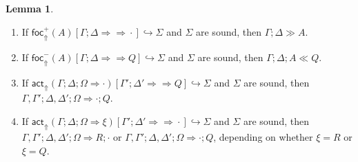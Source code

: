 \documentclass{article}
\theoremstyle{definition}
\newtheorem{lemma}{Lemma}
\newcommand{\bneuseqsymb}{
  \mathrel{\Longrightarrow\!\!\!\!\!\!\!\!\Longrightarrow}}
\newcommand{\bneuseq}[3]{#1 ; #2 \bneuseqsymb #3}
\newcommand{\brfrel}[1]{\textsf{foc}^+_{\Uparrow}(#1)}
\newcommand{\blfrel}[1]{\textsf{foc}^-_{\Uparrow}(#1)}
\newcommand{\bactrel}[1]{\textsf{act}_{\Uparrow}(#1)}
\newcommand{\relj}[3]{#1 [#2] \hookrightarrow #3}
\newcommand{\brfrelj}[3]{\relj{\brfrel{#1}}{#2}{#3}}
\newcommand{\blfrelj}[3]{\relj{\blfrel{#1}}{#2}{#3}}
\newcommand{\bactrelj}[3]{\relj{\bactrel{#1}}{#2}{#3}}
\newcommand{\btriseq}[4]{#1; #2; #3 \Longrightarrow #4}
\newcommand{\rfocseq}[3]{#1; #2 \gg #3}
\newcommand{\lfocseq}[4]{#1; #2; #3 \ll #4}
\begin{document}
\begin{lemma}\label{bkwdder-soundness-lemma}
  \begin{enumerate}
  \item If $\brfrelj{A}{\bneuseq{\Gamma}{\Delta}{\cdot}}{\Sigma}$ and $\Sigma$
    are sound, then $\rfocseq{\Gamma}{\Delta}{A}$.
  \item If $\blfrelj{A}{\bneuseq{\Gamma}{\Delta}{Q}}{\Sigma}$ and $\Sigma$
    are sound, then $\lfocseq{\Gamma}{\Delta}{A}{Q}$. 
  \item If
    $\bactrelj{\btriseq{\Gamma}{\Delta}{\Omega}{\cdot}}{\bneuseq{\Gamma'}{\Delta'}{Q}}{\Sigma}$
    and $\Sigma$ are sound, then $\btriseq{\Gamma, \Gamma'}{\Delta,
      \Delta'}{\Omega}{\cdot ; Q}$.
  \item If
    $\bactrelj{\btriseq{\Gamma}{\Delta}{\Omega}{\xi}}{\bneuseq{\Gamma'}{\Delta'}{\cdot}}{\Sigma}$
    and $\Sigma$ are sound, then
    $\btriseq{\Gamma, \Gamma'}{\Delta, \Delta'}{\Omega}{R ; \cdot}$ or
    $\btriseq{\Gamma, \Gamma'}{\Delta, \Delta'}{\Omega}{\cdot ; Q}$, depending
    on whether $\xi = R$ or $\xi = Q$.
  \end{enumerate}
\end{lemma}
\end{document}

